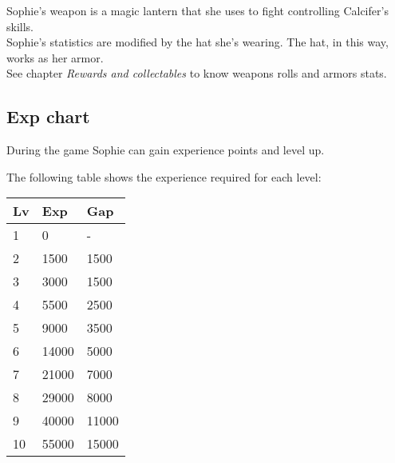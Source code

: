 Sophie's weapon is a magic lantern that she uses to fight controlling Calcifer's skills. \\
Sophie's statistics are modified by the hat she's wearing. The hat, in this way, works as her armor.\\
See chapter \textit{Rewards and collectables} to know weapons rolls and armors stats.

\subsection{Exp chart}
During the game Sophie can gain experience points and level up.

The following table shows the experience required for each level:
\begin{table}[H]
\centering
\begin{tabular}{|l|l|l|}
\hline
\rowcolor[HTML]{C0C0C0} 
\textbf{Lv} & \textbf{Exp} & \textbf{Gap} \\ \hline
1 & 0 & - \\ \hline
2 & 1500 & 1500 \\ \hline
3 & 3000 & 1500 \\ \hline
4 & 5500 & 2500 \\ \hline
5 & 9000 & 3500 \\ \hline
6 & 14000 & 5000 \\ \hline
7 & 21000 & 7000 \\ \hline
8 & 29000 & 8000 \\ \hline
9 & 40000 & 11000 \\ \hline
10 & 55000 & 15000 \\ \hline
\end{tabular}
\end{table}


